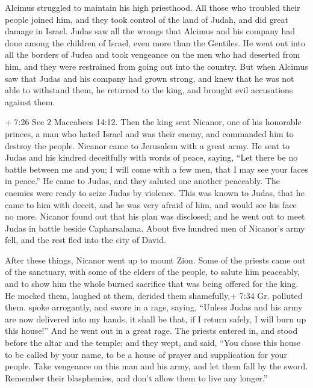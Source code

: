  Alcimus struggled to maintain his high priesthood.
 All those who troubled their people joined him, and they
took control of the land of Judah, and did great damage in Israel.
 Judas saw all the wrongs that Alcimus and his company had
done among the children of Israel, even more than the Gentiles.
 He went out into all the borders of Judea and took
vengeance on the men who had deserted from him, and they were restrained
from going out into the country.  But when Alcimus saw that
Judas and his company had grown strong, and knew that he was not able to
withstand them, he returned to the king, and brought evil accusations
against them.

 + 7:26 See 2 Maccabees 14:12. Then the king sent Nicanor,
one of his honorable princes, a man who hated Israel and was their
enemy, and commanded him to destroy the people.  Nicanor
came to Jerusalem with a great army. He sent to Judas and his kindred
deceitfully with words of peace, saying,  ``Let there be no
battle between me and you; I will come with a few men, that I may see
your faces in peace.''  He came to Judas, and they saluted
one another peaceably. The enemies were ready to seize Judas by
violence.  This was known to Judas, that he came to him
with deceit, and he was very afraid of him, and would see his face no
more.  Nicanor found out that his plan was disclosed; and
he went out to meet Judas in battle beside Capharsalama. 
About five hundred men of Nicanor's army fell, and the rest fled into
the city of David.

 After these things, Nicanor went up to mount Zion. Some of
the priests came out of the sanctuary, with some of the elders of the
people, to salute him peaceably, and to show him the whole burned
sacrifice that was being offered for the king.  He mocked
them, laughed at them, derided them shamefully,+ 7:34 Gr. polluted them.
spoke arrogantly,  and swore in a rage, saying, ``Unless
Judas and his army are now delivered into my hands, it shall be that, if
I return safely, I will burn up this house!'' And he went out in a great
rage.  The priests entered in, and stood before the altar
and the temple; and they wept, and said,  ``You chose this
house to be called by your name, to be a house of prayer and
supplication for your people.  Take vengeance on this man
and his army, and let them fall by the sword. Remember their
blasphemies, and don't allow them to live any longer.''

